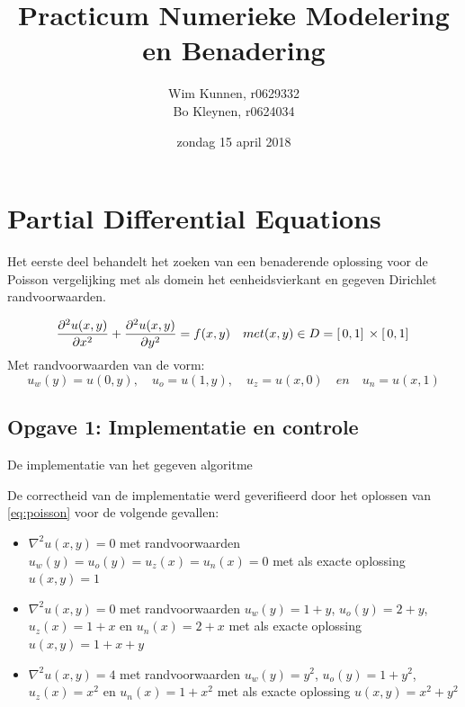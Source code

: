 \documentclass[a4paper]{article}
\title{Practicum Numerieke Modelering en Benadering}
\author{Wim Kunnen, r0629332 \\ Bo Kleynen, r0624034}
\date{zondag 15 april 2018 }
\newcommand{\opgave}[1]{\subsection{Opgave #1}}
\begin{document}
\begin{titlepage}
\maketitle
\thispagestyle{empty}
\end{titlepage}


\setcounter{page}{1}
\tableofcontents
\cleardoublepage

\listoffigures
{}

\listoftables
{}

\lstlistoflistings
{}

\cleardoublepage



\setcounter{page}{1}

\section{Partial Differential Equations}\label{sec:PDE}
Het eerste deel behandelt het zoeken van een benaderende oplossing voor de Poisson vergelijking met als domein het eenheidsvierkant en gegeven Dirichlet randvoorwaarden.

\begin{equation}\label{eq:poisson}
	\pdv[2]{u(x,y)}{x} + \pdv[2]{u(x,y)}{y} = f(x,y) \quad met (x,y) \in D = [ \, 0,1 ]\, \times [ \, 0,1 ]\,
\end{equation}
Met randvoorwaarden van de vorm:
\begin{equation}\nonumber
	u_w(y) = u(0,y), \quad u_o = u(1,y), \quad u_z = u(x,0) \quad en \quad u_n = u(x,1)
\end{equation}



\opgave{1: Implementatie en controle}\label{sec:oef1}
De implementatie van het gegeven algoritme

De correctheid van de implementatie werd geverifieerd door het oplossen van \ref{eq:poisson} voor de volgende gevallen:
\begin{itemize}
	\item $\nabla^2u(x,y)=0$ met randvoorwaarden $u_w(y)=u_o(y)=u_z(x)=u_n(x)=0$ met als exacte oplossing $u(x,y) = 1$
	\item $\nabla^2u(x,y)=0$ met randvoorwaarden $u_w(y)=1+y$, $u_o(y)=2+y$, $u_z(x)=1+x$ en $u_n(x)=2+x$ met als exacte oplossing $u(x,y) = 1 + x + y$
	\item $\nabla^2u(x,y)=4$ met randvoorwaarden $u_w(y)=y^2$, $u_o(y)=1+y^2$, $u_z(x)=x^2$ en $u_n(x)=1+x^2$ met als exacte oplossing $u(x,y) = x^2 +y^2$
\end{itemize}
\end{document}
